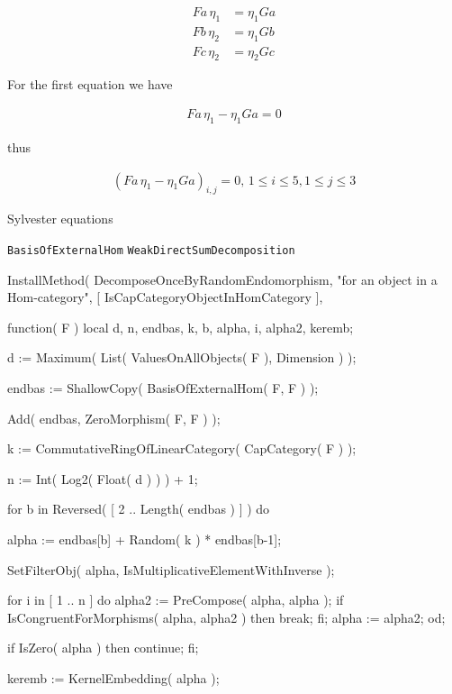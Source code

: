 \begin{align}
Fa\,\eta_{1} &= \eta_{1} Ga \\
Fb\,\eta_{2} &= \eta_{1} Gb \\
Fc\,\eta_{2} &= \eta_{2} Gc
\end{align}

For the first equation we have

\begin{align}
Fa\,\eta_{1} - \eta_{1} Ga = 0
\end{align}

thus

\begin{align}
\left( Fa\,\eta_{1} - \eta_{1} Ga \right)_{i,j} = 0,\, 1\leq i \leq 5, 1\leq j \leq 3
\end{align}

Sylvester equations

\texttt{BasisOfExternalHom}
\texttt{WeakDirectSumDecomposition}

InstallMethod( DecomposeOnceByRandomEndomorphism,
        "for an object in a Hom-category",
        [ IsCapCategoryObjectInHomCategory ],
        
  function( F )
    local d, n, endbas, k, b, alpha, i, alpha2, keremb;
    
    d := Maximum( List( ValuesOnAllObjects( F ), Dimension ) );
    
    endbas := ShallowCopy( BasisOfExternalHom( F, F ) );
    
    Add( endbas, ZeroMorphism( F, F ) );
    
    k := CommutativeRingOfLinearCategory( CapCategory( F ) );
    
    n := Int( Log2( Float( d ) ) ) + 1;
    
    for b in Reversed( [ 2 .. Length( endbas ) ] ) do
        
        alpha := endbas[b] + Random( k ) * endbas[b-1];
        
        SetFilterObj( alpha, IsMultiplicativeElementWithInverse );
        
        for i in [ 1 .. n ] do
            alpha2 := PreCompose( alpha, alpha );
            if IsCongruentForMorphisms( alpha, alpha2 ) then
                break;
            fi;
            alpha := alpha2;
        od;
        
        if IsZero( alpha ) then
            continue;
        fi;
        
        keremb := KernelEmbedding( alpha );
        
